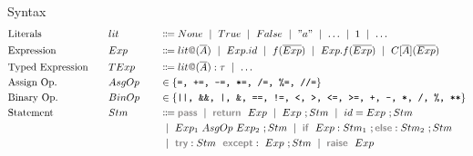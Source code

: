 \documentclass[11pt]{jarticle}
\newcommand{\gray}[1]{\textbf{\textsf{\color{Gray}#1}}}
\begin{document}
Syntax
\begin{alignat*}{3} %
  &\text{Literals} &&lit &&\Coloneqq None ~\mid~ True ~\mid~ False ~\mid~ "a" ~\mid~ \dots ~\mid~ 1 ~\mid~ \dots\\
  &\text{Expression}~~~ &&Exp &&\Coloneqq lit\gray{@}(\overline{A}) ~\mid~ Exp.id  ~\mid~ f(\overline{Exp}) ~\mid~ Exp.f(\overline{Exp}) ~\mid~ C[\overline{A}](\overline{Exp})\\
  &\text{Typed Expression}~~~ &&TExp &&\Coloneqq lit\gray{@}(\overline{A}):\tau ~\mid~ \dots\\
  &\text{Assign Op.} &&AsgOp~~~ &&\in \{\texttt{=, +=, -=, *=, /=, \%=, //=}\}\\
  &\text{Binary Op.} &&BinOp &&\in \{\texttt{||, \&\&, |, \&, ==, !=, <, >, <=, >=, +, -, *, /, \%, **}\}\\
  &\text{Statement} &&Stm &&\Coloneqq \gray{pass} ~\mid~ \gray{return}~~ Exp ~\mid~ Exp ~; Stm ~\mid~ id = Exp ~; Stm \\
  &&&&& ~\mid~ Exp_1~AsgOp~Exp_2 ~; Stm ~\mid~ \gray{if}~~Exp:Stm_1~;\gray{else}:Stm_2 ~;Stm\\
  &&&&& ~\mid~ \gray{try}:Stm ~~ \gray{except}:~Exp~;Stm ~\mid~ \gray{raise} ~~Exp
\end{alignat*}
\end{document}
